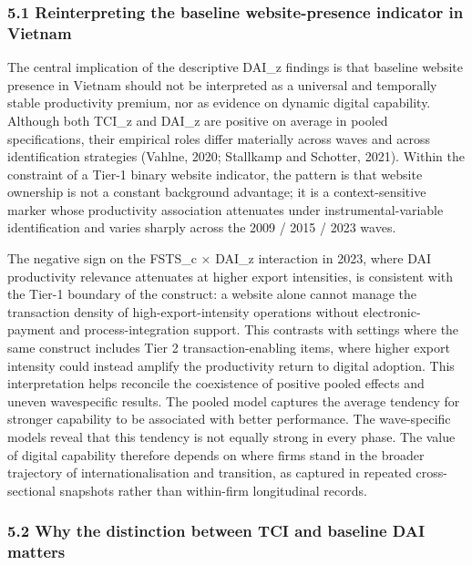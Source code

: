 \documentclass[12pt,a4paper]{article}
\begin{document}
\hypertarget{51-reinterpreting-the-baseline-website-presence-indicator-in-vietnam}{%
\subsubsection{5.1 Reinterpreting the baseline website-presence
indicator in
Vietnam}\label{51-reinterpreting-the-baseline-website-presence-indicator-in-vietnam}}

The central implication of the descriptive DAI\_z findings is that
baseline website presence in Vietnam should not be interpreted as a
universal and temporally stable productivity premium, nor as evidence on
dynamic digital capability. Although both TCI\_z and DAI\_z are positive
on average in pooled specifications, their empirical roles differ
materially across waves and across identification strategies (Vahlne,
2020; Stallkamp and Schotter, 2021). Within the constraint of a Tier-1
binary website indicator, the pattern is that website ownership is not a
constant background advantage; it is a context-sensitive marker whose
productivity association attenuates under instrumental-variable
identification and varies sharply across the 2009 / 2015 / 2023 waves.

The negative sign on the FSTS\_c × DAI\_z interaction in 2023, where DAI
productivity relevance attenuates at higher export intensities, is
consistent with the Tier-1 boundary of the construct: a website alone
cannot manage the transaction density of high-export-intensity
operations without electronic-payment and process-integration support.
This contrasts with settings where the same construct includes Tier 2
transaction-enabling items, where higher export intensity could instead
amplify the productivity return to digital adoption. This interpretation
helps reconcile the coexistence of positive pooled effects and uneven
wavespecific results. The pooled model captures the average tendency for
stronger capability to be associated with better performance. The
wave-specific models reveal that this tendency is not equally strong in
every phase. The value of digital capability therefore depends on where
firms stand in the broader trajectory of internationalisation and
transition, as captured in repeated cross-sectional snapshots rather
than within-firm longitudinal records.

\hypertarget{52-why-the-distinction-between-tci-and-baseline-dai-matters}{%
\subsubsection{5.2 Why the distinction between TCI and baseline DAI
matters}\label{52-why-the-distinction-between-tci-and-baseline-dai-matters}}
\end{document}
